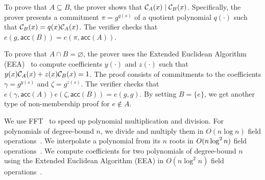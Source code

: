 To prove that $A\subseteq B$, the prover shows that $\mathcal{C}_A(x) \mathrel| \mathcal{C}_{B}(x)$.
Specifically, the prover presents a commitment $\pi=g^{q(s)}$ of a quotient polynomial $q(\cdot)$ such that $\mathcal{C}_B(x) = q(x)\mathcal{C}_A(x)$.
The verifier checks that $e(g, \mathsf{acc}(B)) = e(\pi, \mathsf{acc}(A))$.

To prove that $A\cap B = \varnothing$, the prover uses the Extended Euclidean Algorithm (EEA)~\cite{moderncomputeralgebra-ch11} to compute \bezout coefficients $y(\cdot)$ and $z(\cdot)$ such that $y(x)\mathcal{C}_A(x) + z(x)\mathcal{C}_B(x) = 1$.
The proof consists of commitments to the \bezout coefficients $\gamma = g^{y(s)}$ and $\zeta = g^{z(s)}$.
The verifier checks that $e(\gamma,\mathsf{acc}(A))e(\zeta, \mathsf{acc}(B)) = e(g,g)$.
By setting $B=\{e\}$, we get another type of non-membership proof for $e\notin A$.

We use FFT~\cite{moderncomputeralgebra-ch8} to speed up polynomial multiplication and division.
For polynomials of degree-bound $n$, we divide and multiply them in $O(n\log{n})$ field operations~\cite{preparata-fft-ff}.
We interpolate a polynomial from its $n$ roots in $O(n\log^2{n})$ field operations~\cite{moderncomputeralgebra-ch10}.
We compute \bezout coefficients for two polynomials of degree-bound $n$ using the Extended Euclidean Algorithm (EEA) in $O(n\log^2{n})$ field operations~\cite{moderncomputeralgebra-ch11}.

